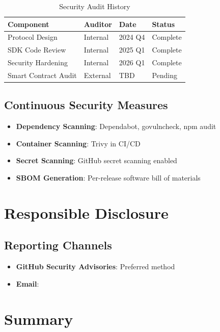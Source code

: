 \begin{table}[htbp]
\centering
\caption{Security Audit History}
\label{tab:audits}
\begin{tabular}{llll}
\toprule
\textbf{Component} & \textbf{Auditor} & \textbf{Date} & \textbf{Status} \\
\midrule
Protocol Design & Internal & 2024 Q4 & Complete \\
SDK Code Review & Internal & 2025 Q1 & Complete \\
Security Hardening & Internal & 2026 Q1 & Complete \\
Smart Contract Audit & External & TBD & Pending \\
\bottomrule
\end{tabular}
\end{table}

\subsection{Continuous Security Measures}

\begin{itemize}
    \item \textbf{Dependency Scanning}: Dependabot, govulncheck, npm audit
    \item \textbf{Container Scanning}: Trivy in CI/CD
    \item \textbf{Secret Scanning}: GitHub secret scanning enabled
    \item \textbf{SBOM Generation}: Per-release software bill of materials
\end{itemize}

\section{Responsible Disclosure}
\label{sec:disclosure}

\subsection{Reporting Channels}

\begin{itemize}
    \item \textbf{GitHub Security Advisories}: Preferred method
    \item \textbf{Email}: 
\end{itemize}

\section{Summary}
\label{sec:security-summary}

